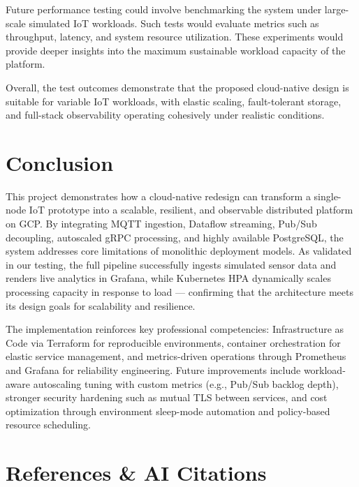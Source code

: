 \documentclass[conference]{IEEEtran}
\begin{document}
Future performance testing could involve benchmarking the system under large-scale simulated IoT workloads. Such tests would evaluate metrics such as throughput, latency, and system resource utilization. These experiments would provide deeper insights into the maximum sustainable workload capacity of the platform.

Overall, the test outcomes demonstrate that the proposed cloud-native design is suitable for variable IoT workloads, with elastic scaling, fault-tolerant storage, and full-stack observability operating cohesively under realistic conditions.

\section{Conclusion}
This project demonstrates how a cloud-native redesign can transform a single-node IoT prototype into a scalable, resilient, and observable distributed platform on GCP. By integrating MQTT ingestion, Dataflow streaming, Pub/Sub decoupling, autoscaled gRPC processing, and highly available PostgreSQL, the system addresses core limitations of monolithic deployment models. As validated in our testing, the full pipeline successfully ingests simulated sensor data and renders live analytics in Grafana, while Kubernetes HPA dynamically scales processing capacity in response to load — confirming that the architecture meets its design goals for scalability and resilience.

The implementation reinforces key professional competencies: Infrastructure as Code via Terraform for reproducible environments, container orchestration for elastic service management, and metrics-driven operations through Prometheus and Grafana for reliability engineering. Future improvements include workload-aware autoscaling tuning with custom metrics (e.g., Pub/Sub backlog depth), stronger security hardening such as mutual TLS between services, and cost optimization through environment sleep-mode automation and policy-based resource scheduling.

\section*{References \& AI Citations}
\end{document}
